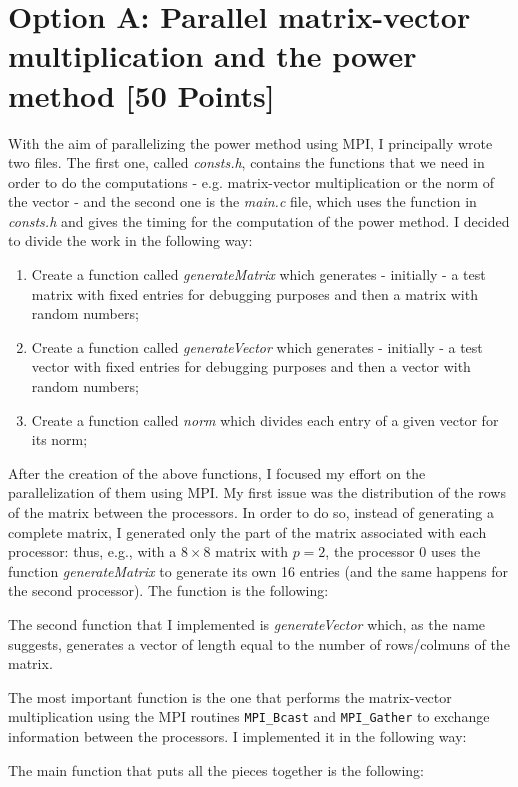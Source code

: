 \documentclass[unicode,11pt,a4paper,oneside,numbers=endperiod,openany]{scrartcl}
\begin{document}
\section{Option A: Parallel matrix-vector multiplication and the power method [50 Points]}
With the aim of parallelizing the power method using MPI, I principally wrote two files. The first one, called \textit{consts.h}, contains the functions that we need in order to do the computations - e.g. matrix-vector multiplication or the norm of the vector - and the second one is the \textit{main.c} file, which uses the function in \textit{consts.h} and gives the timing for the computation of the power method. I decided to divide the work in the following way:
\begin{enumerate}
	\item Create a function called \textit{generateMatrix} which generates - initially - a test matrix with fixed entries for debugging purposes and then a matrix with random numbers;
	\item Create a function called \textit{generateVector} which generates - initially - a test vector with fixed entries for debugging purposes and then a vector with random numbers;
	\item Create a function called \textit{norm} which divides each entry of a given vector for its norm;
\end{enumerate}
After the creation of the above functions, I focused my effort on the parallelization of them using MPI. 
My first issue was the distribution of the rows of the matrix between the processors. In order to do so, instead of generating a complete matrix, I generated only the part of the matrix associated with each processor: thus, e.g., with a $8 \times 8$ matrix with $p = 2$, the processor 0 uses the function \textit{generateMatrix} to generate its own 16 entries (and the same happens for the second processor). The function is the following:


The second function that I implemented is \textit{generateVector} which, as the name suggests, generates a vector of length equal to the number of rows/colmuns of the matrix.


The most important function is the one that performs the matrix-vector multiplication using the MPI routines \texttt{MPI\_Bcast} and \texttt{MPI\_Gather} to exchange information between the processors. I implemented it in the following way:

The main function that puts all the pieces together is the following: 

\end{document}
